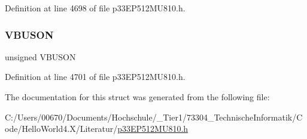 Definition at line 4698 of file p33\+E\+P512\+M\+U810.\+h.

\mbox{\label{structtag_u1_o_t_g_c_o_n_b_i_t_s_a78c21435351b775598cfef420f0292fd}} 
\subsubsection{\texorpdfstring{V\+B\+U\+S\+ON}{VBUSON}}
{\footnotesize\ttfamily unsigned V\+B\+U\+S\+ON}



Definition at line 4701 of file p33\+E\+P512\+M\+U810.\+h.



The documentation for this struct was generated from the following file\+:\begin{DoxyCompactItemize}
\item 
C\+:/\+Users/00670/\+Documents/\+Hochschule/\+\_\+\+Tier1/73304\+\_\+\+Technische\+Informatik/\+Code/\+Hello\+World4.\+X/\+Literatur/\hyperlink{p33_e_p512_m_u810_8h}{p33\+E\+P512\+M\+U810.\+h}\end{DoxyCompactItemize}
